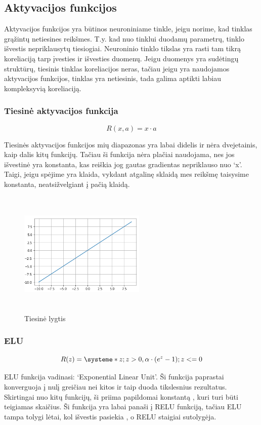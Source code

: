 \documentclass{VUMIFInfKursinis}
\begin{document}
\subsection{Aktyvacijos funkcijos}
\par
Aktyvacijos funkcijos yra būtinos neuroniniame tinkle, jeigu norime, kad tinklas
grąžintų netiesines reikšmes. T.y. kad nuo tinklui duodamų parametrų, tinklo išvestis
nepriklausytų tiesiogiai. \cite{salt18} Neuroninio tinklo tikslas yra rasti tam tikrą
koreliaciją tarp įvesties ir išvesties duomenų. Jeigu duomenys yra sudėtingų struktūrų,
tiesinis tinklas koreliacijos neras, tačiau jeigu yra naudojamos aktyvacijos funkcijos,
tinklas yra netiesinis, tada galima aptikti labiau kompleksyvią koreliaciją. \cite{salt18}

\subsubsection{Tiesinė aktyvacijos funkcija}
\[
R(x, a) = x \cdot a
\]
\par
Tiesinės aktyvacijos funkcijos mių diapazonas yra labai didelis ir nėra dvejetainis,
kaip dalis kitų funkcijų. Tačiau ši funkcija nėra plačiai naudojama, nes jos
išvestinė yra konstanta, kas reiškia jog gautas gradientas nepriklauso nuo ‘x’.
Taigi, jeigu spėjime yra klaida, vykdant atgalinę sklaidą mes reikšmę taisysime
konstanta, neatsižvelgiant į pačią klaidą. \cite{salt16}

\begin{figure}[ht]
  \centering
  \includegraphics[width=6cm,height=6cm,keepaspectratio]{tiesine.png}
  \caption{Tiesinė lygtis}
  \label{fig:lygtis1}
\end{figure}

\subsubsection{ELU}
\[
  R(z) = \systeme*{z; z > 0, \alpha \cdot (e^z - 1); z <= 0}
\]
\par
ELU funkcija vadinasi: ‘Exponential Linear Unit’. Ši funkcija paprastai konverguoja į
nulį greičiau nei kitos ir taip duoda tikslesnius rezultatus. Skirtingai nuo kitų
funkcijų, ši priima papildomai konstantą , kuri turi būti teigiamas skaičius.
Ši funkcija yra labai panaši į RELU funkciją, tačiau ELU tampa tolygi lėtai,
kol išvestis pasiekia , o RELU staigiai sutolygėja. \cite{salt16}
\end{document}

